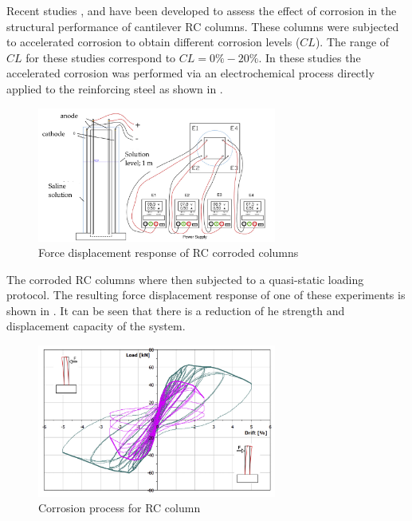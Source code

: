 Recent studies \cite{Ma2012}, \cite{Meda2014} and \cite{Yang2016} have been developed to assess the effect of corrosion in the structural performance of cantilever RC columns. These columns were subjected to accelerated corrosion to obtain different corrosion levels ($CL$). The range of $CL$ for these studies correspond to $CL=0\%-20\%$. In these studies the accelerated corrosion was performed via an electrochemical process directly applied to the reinforcing steel as shown in .

\begin{figure}[htbp]
	\centering
	\includegraphics[width=0.7\textwidth]{Chapter-3/figs/Meda_Corrosion}
	\caption{Force displacement response of RC corroded columns \cite{Meda2014}}
	\label{fig:Meda_RC_CorrosionProc}
\end{figure}

The corroded RC columns where then subjected to a quasi-static loading protocol. The resulting force displacement response of one of these experiments is shown in . It can be seen that there is a reduction of he strength and displacement capacity of the system. 

\begin{figure}[htbp]
	\centering
	\includegraphics[width=0.7\textwidth]{Chapter-3/figs/Meda_F-D_01}
	\caption{Corrosion process for RC column \cite{Meda2014}}
	\label{fig:Meda_FD}
\end{figure}

